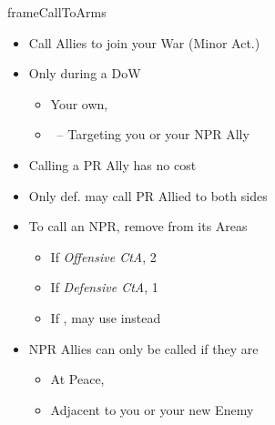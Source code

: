 \documentclass[10pt]{article}
\newlength{\fhCallToArms} \setlength\fhCallToArms{16\baselineskip}
\begin{document}
\begin{dynamiccontents*}{frameCallToArms}\begin{eubox}{\fhCallToArms}
	\begin{itemize}
		\item Call Allies to join your War (Minor Act.)
		\item Only during a DoW
		\begin{itemize}
			\item Your own, 
			\item \reaction~-- Targeting you or your NPR Ally
		\end{itemize}
		\item Calling a PR Ally has no cost
		\item Only def. may call PR Allied to both sides
		\item To call an NPR, remove \influence from its Areas
		\begin{itemize}
			\item If \emph{Offensive CtA}, 2\influence
			\item If \emph{Defensive CtA}, 1\influence
			\item If , may use \colonists instead
		\end{itemize}
		\item NPR Allies can only be called if they are
		\begin{itemize}
			\item At Peace, 
			\item Adjacent to you or your new Enemy
		\end{itemize}
	\end{itemize}
\end{eubox}\end{dynamiccontents*}
\end{document}
